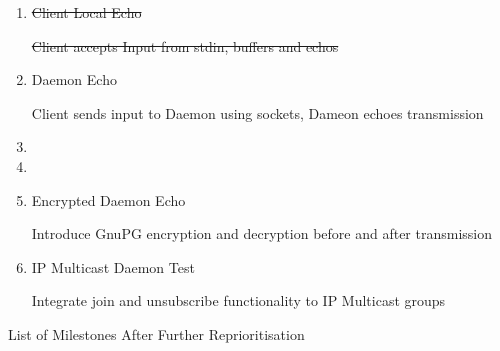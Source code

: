 \begin{table}[Hbt]

\begin{center}

\begin{enumerate}

\item \sout{Client Local Echo}

	\subitem \sout{Client accepts Input from stdin, buffers and echos}

\item Daemon Echo 

	\subitem Client sends input to Daemon using sockets, Dameon 
	echoes transmission

\item {}

	\subitem {}

\item {}

	\subitem {}

\item Encrypted Daemon Echo 

	\subitem Introduce GnuPG encryption and decryption before and after 
	transmission 

\item IP Multicast Daemon Test

	\subitem Integrate join and unsubscribe functionality to IP Multicast
	groups

\end{enumerate}

\end{center}

\caption{List of Milestones After Further Reprioritisation}

\end{table}

